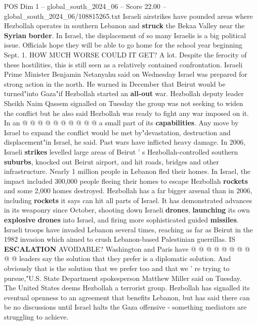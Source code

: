 \begin{textsample}{POS Dim 1 – global\_south\_2024\_06 – Score 22.00 – global\_south\_2024\_06/108815265.txt}
Israeli airstrikes have pounded areas where Hezbollah operates in southern Lebanon and \textbf{struck} the Bekaa Valley near the \textbf{Syrian} \textbf{border}.
In Israel, the displacement of so many Israelis is a big political issue.
Officials hope they will be able to go home for the school year beginning Sept. 1.
HOW MUCH WORSE COULD IT GET?
A lot.
Despite the ferocity of these hostilities, this is still seen as a relatively contained confrontation.
Israeli Prime Minister Benjamin Netanyahu said on Wednesday Israel was prepared for strong action in the north.
He warned in December that Beirut would be turned"into Gaza"if Hezbollah started an \textbf{all-out} war.
Hezbollah deputy leader Sheikh Naim Qassem signalled on Tuesday the group was not seeking to widen the conflict but he also said Hezbollah was ready to fight any war imposed on it.
In an @ @ @ @ @ @ @ @ @ @ a small part of its \textbf{capabilities}.
Any move by Israel to expand the conflict would be met by"devastation, destruction and displacement"in Israel, he said.
Past wars have inflicted heavy damage.
In 2006, Israeli \textbf{strikes} levelled large areas of Beirut ' s Hezbollah-controlled southern \textbf{suburbs}, knocked out Beirut airport, and hit roads, bridges and other infrastructure.
Nearly 1 million people in Lebanon fled their homes.
In Israel, the impact included 300,000 people fleeing their homes to escape Hezbollah \textbf{rockets} and some 2,000 homes destroyed.
Hezbollah has a far bigger arsenal than in 2006, including \textbf{rockets} it says can hit all parts of Israel.
It has demonstrated advances in its weaponry since October, shooting down Israeli \textbf{drones}, \textbf{launching} its own \textbf{explosive} \textbf{drones} into Israel, and firing more sophisticated guided \textbf{missiles}.
Israeli troops have invaded Lebanon several times, reaching as far as Beirut in the 1982 invasion which aimed to crush Lebanon-based Palestinian guerrillas.
IS \textbf{ESCALATION} AVOIDABLE?
Washington and Paris have @ @ @ @ @ @ @ @ @ @ leaders say the solution that they prefer is a diplomatic solution.
And obviously that is the solution that we prefer too and that we ' re trying to pursue,"U.S.
State Department spokesperson Matthew Miller said on Tuesday.
The United States deems Hezbollah a terrorist group.
Hezbollah has signalled its eventual openness to an agreement that benefits Lebanon, but has said there can be no discussions until Israel halts the Gaza offensive - something mediators are struggling to achieve.

\end{textsample}
